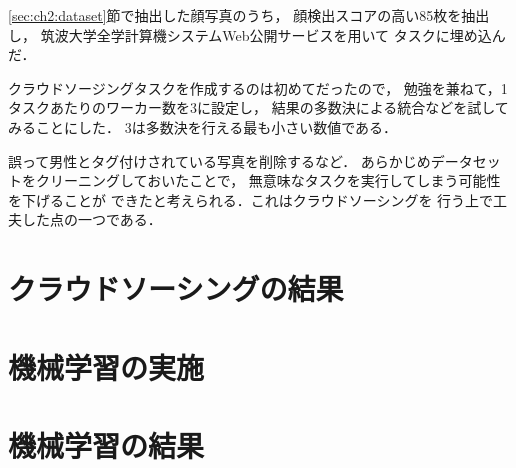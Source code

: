 \ref{sec:ch2:dataset}節で抽出した顔写真のうち，
顔検出スコアの高い85枚を抽出し，
筑波大学全学計算機システムWeb公開サービスを用いて
タスクに埋め込んだ．

クラウドソージングタスクを作成するのは初めてだったので，
勉強を兼ねて，1タスクあたりのワーカー数を3に設定し，
結果の多数決による統合などを試してみることにした．
3は多数決を行える最も小さい数値である．

誤って男性とタグ付けされている写真を削除するなど．
あらかじめデータセットをクリーニングしておいたことで，
無意味なタスクを実行してしまう可能性を下げることが
できたと考えられる．これはクラウドソーシングを
行う上で工夫した点の一つである．

\section{クラウドソーシングの結果}
\section{機械学習の実施}
\section{機械学習の結果}